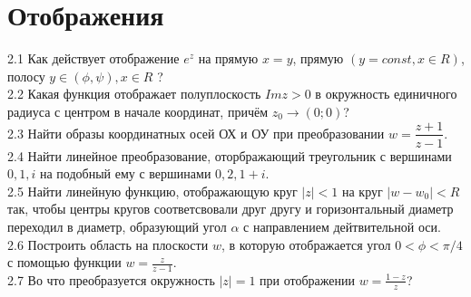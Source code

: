 \documentclass{article}
\begin{document}
\section{Отображения}
2.1 Как действует отображение $e^z$ на прямую $x=y$, прямую $(y=const, x\in R)$, полосу $y\in(\phi, \psi), x\in R$ ?\\
2.2 Какая функция отображает полуплоскость $Im z > 0$ в окружность единичного радиуса с центром в начале координат, причём $z_0 \rightarrow (0; 0)$? \\
2.3 Найти образы координатных осей ОХ и ОУ при преобразовании $w= \dfrac{z+1}{z-1}$.\\
2.4 Найти линейное преобразование, оторбражающий треугольник с вершинами $0, 1, i$  на подобный ему с вершинами $0, 2, 1+i$.\\
2.5 Найти линейную функцию, отображающую круг $\vert z \vert < 1$  на круг $\vert w - w_0 \vert < R$ так, чтобы центры кругов соответсвовали друг другу и горизонтальный диаметр переходил в диаметр, образующий угол $\alpha$ с направлением дейтвительной оси.\\
2.6 Построить область на плоскости $w$, в которую отображается угол $0<\phi<\pi/4$ с помощью функции $w=\frac{z}{z-1}$.\\
2.7 Во что преобразуется окружность $\vert z \vert =1 $ при отображении $w=\frac{1-z}{z}$?
\end{document}

